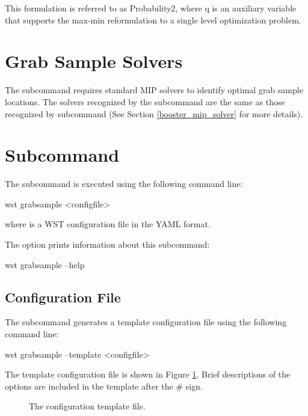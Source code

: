 This formulation is referred to as Probability2, where q is an auxiliary variable that
supports the max-min reformulation to a single level optimization problem.

\section{Grab Sample Solvers}
The  subcommand requires standard MIP solvers to
identify optimal grab sample locations. The solvers recognized by
the  subcommand are the same as those recognized
by  subcommand (See
Section \ref{booster_mip_solver} for more details).
     
\section{ Subcommand}

The  subcommand is executed using the following
command line:
\begin{unknownListing}
wst grabsample <configfile>
\end{unknownListing}
where  is a WST configuration file in the YAML format. 

The  option prints information about this subcommand:
\begin{unknownListing}
wst grabsample --help
\end{unknownListing}

\subsection{Configuration File}

The  subcommand generates a template configuration
file using the following command line:

\begin{unknownListing}
wst grabsample --template <configfile>
\end{unknownListing}

The  template configuration file is shown in
Figure \ref{fig:grabsample_template}. Brief descriptions of the
options are included in the template after the \# sign.

\begin{figure}[H]
  \caption{The  configuration template file.}
  \label{fig:grabsample_template}
\end{figure}

